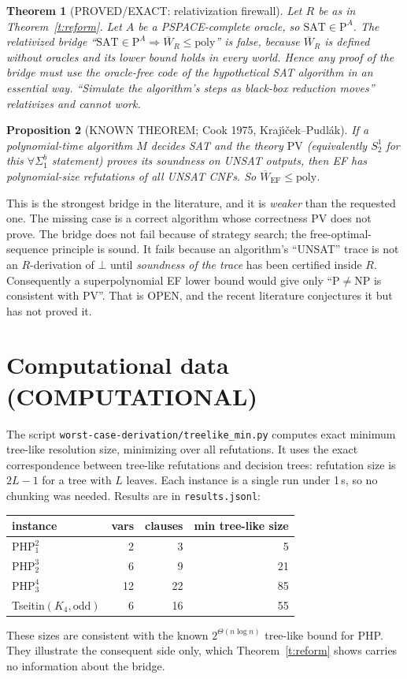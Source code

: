 \documentclass[11pt]{article}
\newtheorem{theorem}{Theorem}\newtheorem{proposition}[theorem]{Proposition}
\theoremstyle{remark}\newtheorem{remark}[theorem]{Remark}
\begin{document}
\begin{theorem}[PROVED/EXACT: relativization firewall]\label{t:rel}
Let $R$ be as in Theorem~\ref{t:reform}. Let $A$ be a PSPACE-complete oracle, so $\mathrm{SAT}\in\mathrm P^A$.
The relativized bridge ``$\mathrm{SAT}\in\mathrm P^A\Rightarrow\overline W_R\le\mathrm{poly}$'' is
\emph{false}, because $\overline W_R$ is defined without oracles and its lower bound holds in every world.
Hence any proof of the bridge must use the oracle-free code of the hypothetical SAT algorithm in an
essential way. ``Simulate the algorithm's steps as black-box reduction moves'' relativizes and cannot work.
\end{theorem}

\begin{proposition}[KNOWN THEOREM; Cook 1975, Kraj\'{\i}\v{c}ek--Pudl\'ak]\label{p:pv}
If a polynomial-time algorithm $M$ decides SAT and the theory $\mathrm{PV}$ (equivalently $S^1_2$ for this
$\forall\Sigma^b_1$ statement) proves its soundness on UNSAT outputs, then EF has polynomial-size refutations
of all UNSAT CNFs. So $\overline W_{\mathrm{EF}}\le\mathrm{poly}$.
\end{proposition}
This is the strongest bridge in the literature, and it is \emph{weaker} than the requested one. The missing
case is a correct algorithm whose correctness PV does not prove. The bridge does not fail because of strategy
search; the free-optimal-sequence principle is sound. It fails because an algorithm's ``UNSAT'' trace is not
an $R$-derivation of $\bot$ until \emph{soundness of the trace} has been certified inside $R$. Consequently a
superpolynomial EF lower bound would give only ``P$\ne$NP is consistent with PV''. That is OPEN, and the
recent literature conjectures it but has not proved it.

\section{Computational data (COMPUTATIONAL)}
The script \texttt{worst-case-derivation/treelike\_min.py} computes exact minimum tree-like resolution size,
minimizing over all refutations. It uses the exact correspondence between tree-like refutations and decision
trees: refutation size is $2L-1$ for a tree with $L$ leaves. Each instance is a single run under 1\,s, so no
chunking was needed. Results are in \texttt{results.jsonl}:
\begin{center}\begin{tabular}{lrrr}
instance & vars & clauses & min tree-like size\\\hline
$\mathrm{PHP}^2_1$&2&3&5\\ $\mathrm{PHP}^3_2$&6&9&21\\ $\mathrm{PHP}^4_3$&12&22&85\\
Tseitin$(K_4,\text{odd})$&6&16&55
\end{tabular}\end{center}
These sizes are consistent with the known $2^{\Theta(n\log n)}$ tree-like bound for PHP. They illustrate
the consequent side only, which Theorem~\ref{t:reform} shows carries no information about the bridge.
\end{document}
